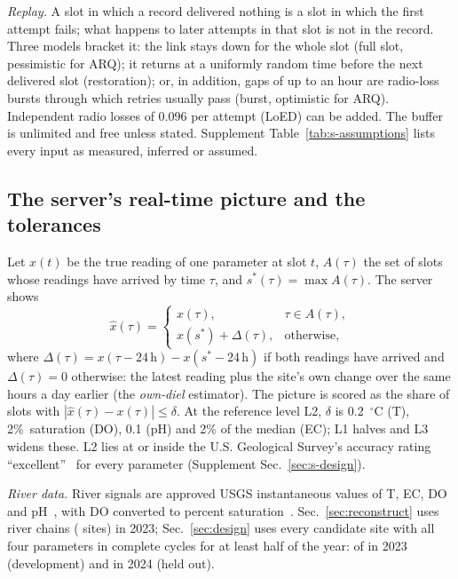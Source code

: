 \emph{Replay.} A slot in which a record delivered nothing is a slot in which the first attempt fails; what happens to later attempts in that slot is not in the record. Three models bracket it: the link stays down for the whole slot (full slot, pessimistic for ARQ); it returns at a uniformly random time before the next delivered slot (restoration); or, in addition, gaps of up to an hour are radio-loss bursts through which retries usually pass (burst, optimistic for ARQ). Independent radio losses of 0.096 per attempt (LoED) can be added. The buffer is unlimited and free unless stated. Supplement Table~\ref{tab:s-assumptions} lists every input as measured, inferred or assumed.

\subsection{The server's real-time picture and the tolerances}
\label{sec:data-picture}
Let $x(t)$ be the true reading of one parameter at slot $t$, $A(\tau)$ the set of slots whose readings have arrived by time $\tau$, and $s^\ast(\tau)=\max A(\tau)$. The server shows
\begin{equation}
\hat{x}(\tau)=\begin{cases}
x(\tau), & \tau\in A(\tau),\\
x(s^\ast)+\Delta(\tau), & \text{otherwise},
\end{cases}
\label{eq:picture}
\end{equation}
where $\Delta(\tau)=x(\tau-24\,\mathrm{h})-x(s^\ast-24\,\mathrm{h})$ if both readings have arrived and $\Delta(\tau)=0$ otherwise: the latest reading plus the site's own change over the same hours a day earlier (the \emph{own-diel} estimator). The picture is scored as the share of slots with $|\hat{x}(\tau)-x(\tau)|\le\delta$. At the reference level L2, $\delta$ is 0.2~$^\circ$C (T), 2\%~saturation (DO), 0.1 (pH) and 2\% of the median (EC); L1 halves and L3 widens these. L2 lies at or inside the U.S. Geological Survey's accuracy rating ``excellent''~\cite{wagner2006usgs} for every parameter (Supplement Sec.~\ref{sec:s-design}).

\emph{River data.} River signals are approved USGS instantaneous values of T, EC, DO and pH~\cite{usgs2023nwis}, with DO converted to percent saturation~\cite{benson1984oxygen}. Sec.~\ref{sec:reconstruct} uses \chainCount{} river chains (\chainSites{} sites) in 2023; Sec.~\ref{sec:design} uses every candidate site with all four parameters in complete cycles for at least half of the year: \designSites{} of \designCandidates{} in 2023 (development) and \confSites{} in 2024 (held out).
